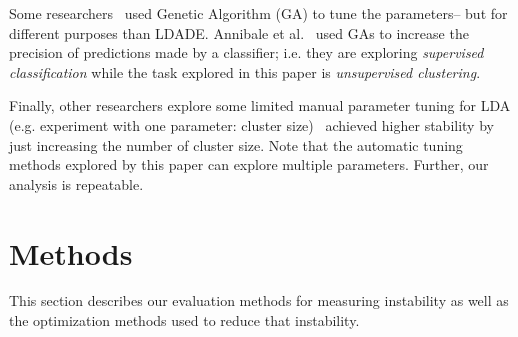 \documentclass[10pt,conference]{IEEEtran}
\makeatletter
\newcommand{\mybox}[1]{%
  \setbox0=\hbox{#1}%
  \setlength{\@tempdima}{\dimexpr\linewidth}%
  \begin{tcolorbox}[colframe=mycolor,boxrule=0.5pt,arc=4pt,
      left=6pt,right=6pt,top=6pt,bottom=6pt,boxsep=0pt,width=\@tempdima]
    #1
  \end{tcolorbox}
}
\theoremstyle{break}
\makeatother
\begin{document}
Some researchers~\cite{panichella2013effectively, lohar2013improving, sun2015msr4sm}
used Genetic Algorithm (GA) to tune the parameters-- but for different
purposes than LDADE. Annibale et al.~\cite{panichella2013effectively} used GAs to increase the precision
of predictions made by a classifier; i.e. they are exploring
{\em supervised classification} while the task explored in this paper is
{\em unsupervised clustering}.

Finally, other researchers explore
some limited manual parameter tuning for LDA
(e.g. experiment with one parameter: cluster size)~\cite{galvis2013analysis, tian2009using}
achieved higher stability by just increasing the number of cluster size.
Note that the automatic tuning methods explored by this paper can
explore multiple parameters. Further, our analysis is repeatable.





\section{Methods}
\label{sect:evaluation}
This section describes our evaluation methods for measuring instability as well as the optimization
methods used to reduce that instability.
\end{document}
